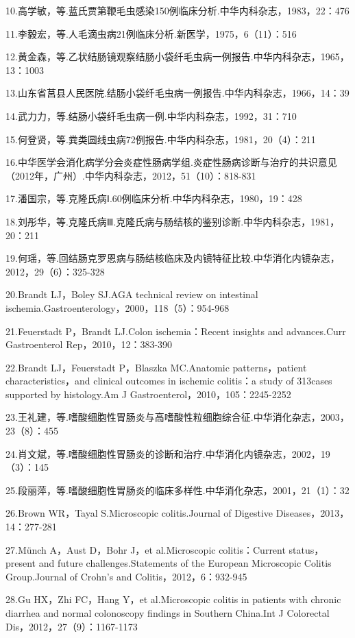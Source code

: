 10.高学敏，等.蓝氏贾第鞭毛虫感染150例临床分析.中华内科杂志，1983，22：476

11.李毅宏，等.人毛滴虫病21例临床分析.新医学，1975，6（11）：516

12.黄金森，等.乙状结肠镜观察结肠小袋纤毛虫病一例报告.中华内科杂志，1965，13：1003

13.山东省莒县人民医院.结肠小袋纤毛虫病一例报告.中华内科杂志，1966，14：39

14.武力力，等.结肠小袋纤毛虫病一例.中华内科杂志，1992，31：710

15.何登贤，等.粪类圆线虫病72例报告.中华内科杂志，1981，20（4）：211

16.中华医学会消化病学分会炎症性肠病学组.炎症性肠病诊断与治疗的共识意见（2012年，广州）.中华内科杂志，2012，51（10）：818-831

17.潘国宗，等.克隆氏病Ⅰ.60例临床分析.中华内科杂志，1980，19：428

18.刘彤华，等.克隆氏病Ⅲ.克隆氏病与肠结核的鉴别诊断.中华内科杂志，1981，20：211

19.何瑶，等.回结肠克罗恩病与肠结核临床及内镜特征比较.中华消化内镜杂志，2012，29（6）：325-328

20.Brandt LJ，Boley SJ.AGA technical review on intestinal
ischemia.Gastroenterology，2000，118（5）：954-968

21.Feuerstadt P，Brandt LJ.Colon ischemia：Recent insights and
advances.Curr Gastroenterol Rep，2010，12：383-390

22.Brandt LJ，Feuerstadt P，Blaszka MC.Anatomic patterns，patient
characteristics，and clinical outcomes in ischemic colitis：a study of
313cases supported by histology.Am J Gastroenterol，2010，105：2245-2252

23.王礼建，等.嗜酸细胞性胃肠炎与高嗜酸性粒细胞综合征.中华消化杂志，2003，23（8）：455

24.肖文斌，等.嗜酸细胞性胃肠炎的诊断和治疗.中华消化内镜杂志，2002，19（3）：145

25.段丽萍，等.嗜酸细胞性胃肠炎的临床多样性.中华消化杂志，2001，21（1）：32

26.Brown WR，Tayal S.Microscopic colitis.Journal of Digestive
Diseases，2013，14：277-281

27.Münch A，Aust D，Bohr J，et al.Microscopic colitis：Current
status，present and future challenges.Statements of the European
Microscopic Colitis Group.Journal of Crohn's and
Colitis，2012，6：932-945

28.Gu HX，Zhi FC，Hang Y，et al.Microscopic colitis in patients with
chronic diarrhea and normal colonoscopy findings in Southern China.Int J
Colorectal Dis，2012，27（9）：1167-1173

